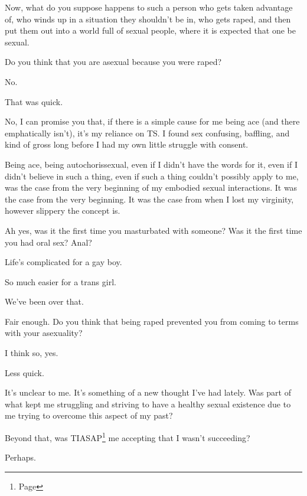 Now, what do you suppose happens to such a person who gets taken advantage of, who winds up in a situation they shouldn't be in, who gets raped, and then put them out into a world full of sexual people, where it is expected that one be sexual.
\newpage

\begin{ally}
Do you think that you are asexual because you were raped?
\end{ally}
No.

\begin{ally}
That was quick.
\end{ally}
No, I can promise you that, if there is a simple cause for me being ace (and there emphatically isn't), it's my reliance on TS. I found sex confusing, baffling, and kind of gross long before I had my own little struggle with consent.

Being ace, being autochorissexual, even if I didn't have the words for it, even if I didn't believe in such a thing, even if such a thing couldn't possibly apply to me, was the case from the very beginning of my embodied sexual interactions. It was the case from the very beginning. It was the case from when I lost my virginity, however slippery the concept is.

\begin{ally}
Ah yes, was it the first time you masturbated with someone? Was it the first time you had oral sex? Anal?
\end{ally}
Life's complicated for a gay boy.

\begin{ally}
So much easier for a trans girl.
\end{ally}
We've been over that.

\begin{ally}
Fair enough. Do you think that being raped prevented you from coming to terms with your asexuality?
\end{ally}
I think so, yes.

\begin{ally}
Less quick.
\end{ally}
It's unclear to me. It's something of a new thought I've had lately. Was part of what kept me struggling and striving to have a healthy sexual existence due to me trying to overcome this aspect of my past?

Beyond that, was TIASAP\footnote{Page \pageref{selfharm:selfharm}} me accepting that I wasn't succeeding?

Perhaps.


